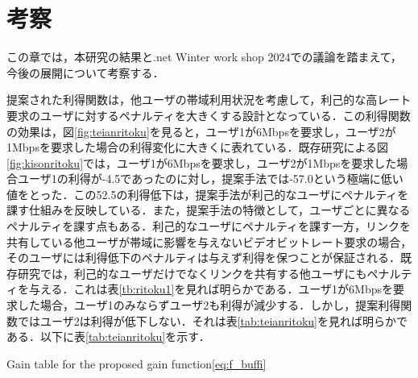 \chapter{考察}
この章では，本研究の結果と.net Winter work shop 2024での議論を踏まえて，今後の展開について考察する．

提案された利得関数は，他ユーザの帯域利用状況を考慮して，利己的な高レート要求のユーザに対するペナルティを大きくする設計となっている．この利得関数の効果は，図\ref{fig:teianritoku}を見ると，ユーザ1が6Mbpsを要求し，ユーザ2が1Mbpsを要求した場合の利得変化に大きくに表れている．既存研究\cite{kison}\cite{motomoto}による図\ref{fig:kisonritoku}では，ユーザ1が6Mbpsを要求し，ユーザ2が1Mbpsを要求した場合ユーザ1の利得が-4.5であったのに対し，提案手法では-57.0という極端に低い値をとった．この52.5の利得低下は，提案手法が利己的なユーザにペナルティを課す仕組みを反映している．また，提案手法の特徴として，ユーザごとに異なるペナルティを課す点もある．利己的なユーザにペナルティを課す一方，リンクを共有している他ユーザが帯域に影響を与えないビデオビットレート要求の場合，そのユーザには利得低下のペナルティは与えず利得を保つことが保証される．既存研究\cite{kison}\cite{motomoto}では，利己的なユーザだけでなくリンクを共有する他ユーザにもペナルティを与える．これは表\ref{tb:ritoku1}を見れば明らかである．ユーザ1が6Mbpsを要求した場合，ユーザ1のみならずユーザ2も利得が減少する．しかし，提案利得関数ではユーザ2は利得が低下しない．それは表\ref{tab:teianritoku}を見れば明らかである．以下に表\ref{tab:teianritoku}を示す．
\begin{table}[h]
    \centering
                {Gain table for the proposed gain function\ref{eq:f_buffi}}
\end{table}
